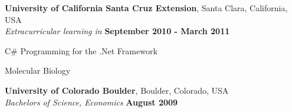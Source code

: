 \documentclass[margin,line]{resume}
\begin{document}
\begin{resume}
    \textbf{University of California Santa Cruz Extension}, Santa Clara, California, USA \vspace{1mm}\\\vspace{1mm}%
    \textsl{Extracurricular learning in} \hfill \textbf{September 2010 - March 2011}\vspace{-3mm}\\\vspace{-1mm}%
    \begin{list2}
        \item C\# Programming for the .Net Framework
        \item Molecular Biology	
    \end{list2}\vspace{-1.5mm}

\textbf{University of Colorado Boulder}, Boulder, Colorado, USA \vspace{1mm}\\\vspace{1mm}%
    \textsl{Bachelors of Science, Economics} \hfill \textbf{ August 2009}\vspace{-3mm}\\\vspace{-1mm}%



\end{resume}
\end{document}
